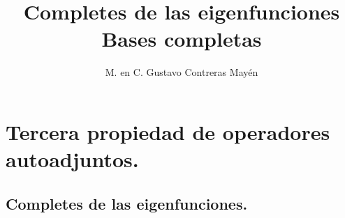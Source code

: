 
\title{Completes de las eigenfunciones \\ \large {Bases completas}\vspace{-3ex}}

\author{M. en C. Gustavo Contreras Mayén}
\date{ }

\pagestyle{fancy}
\fancyhf{}
\lhead{\leftmark}
\rfoot{\thepage}
\setlength{\headheight}{16pt}%


\maketitle
\fontsize{14}{14}\selectfont
\tableofcontents
\newpage


\section{Tercera propiedad de operadores autoadjuntos.}
\subsection{Completes de las eigenfunciones.}

